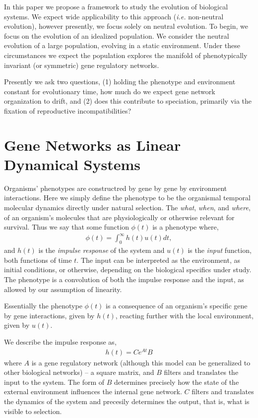 \documentclass[9 pt]{article}
\newcommand{\1}{\mathbbm{1}}
\begin{document}
  In this paper we propose a framework to study the evolution of biological systems. We expect wide applicability to this approach (\emph{i.e.} non-neutral evolution), however presently, we focus solely on neutral evolution. To begin, we focus on the evolution of an idealized population. We consider the neutral evolution of a large population, evolving in a static environment. Under these circumstances we expect the population explores the manifold of phenotypically invariant (or symmetric) gene regulatory networks.

  Presently we ask two questions, (1) holding the phenotype and environment constant for evolutionary time, how much do we expect gene network organization to drift, and (2) does this contribute to speciation, primarily via the fixation of reproductive incompatibilities?

\section*{Gene Networks as Linear Dynamical Systems}

  Organisms' phenotypes are constructred by gene by gene by environment interactions. Here we simply define the phenotype to be the organismal temporal molecular dynamics directly under natural selection. The \emph{what}, \emph{when}, and \emph{where}, of an organism's molecules that are physiologically or otherwise relevant for survival. Thus we say that some function $\phi(t)$ is a phenotype where, 
  \begin{align}
    \phi(t) = \int_{0}^{\infty} h(t) u(t) dt  ,
  \end{align}
  and $h(t)$ is the \emph{impulse response} of the system and $u(t)$ is the \emph{input} function, both functions of time $t$. The input can be interpreted as the environment, as initial conditions, or otherwise, depending on the biological specifics under study. The phenotype is a convolution of both the impulse response and the input, as allowed by our assumption of linearity. 

  Essentially the phenotype $\phi(t)$ is a consequence of an organism's specific gene by gene interactions, given by $h(t)$, reacting further with the local environment, given by $u(t)$. 

  We describe the impulse response as, 
  \begin{align}
    h(t) = C e^{A t} B
  \end{align}
  where $A$ is a gene regulatory network (although this model can be generalized to other biological networks) -- a square matrix, and $B$ filters and translates the input to the system. The form of $B$ determines precisely how the state of the external environment influences the internal gene network. $C$ filters and translates the dynamics of the system and precesily determines the output, that is, what is visible to selection. 
\end{document}
